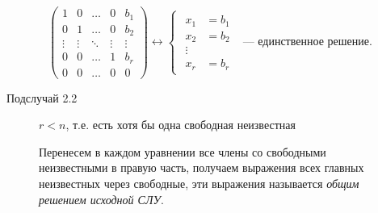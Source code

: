 \begin{description}
\begin{description}
        \begin{equation*}
            \begin{pmatrix}
                1 & 0 & \dots & 0 & b_1 \\
                0 & 1 & \dots & 0 & b_2 \\
                \vdots & \vdots & \ddots & \vdots & \vdots \\
                0 & 0 & \dots & 1 & b_r \\
                0 & 0 & \dots & 0 & 0
            \end{pmatrix} \leftrightarrow \begin{cases}
                \begin{aligned}
                    x_1 &= b_1 \\
                    x_2 &= b_2 \\
                    \vdots \\
                    x_r &= b_r
                \end{aligned}
            \end{cases} \text{ --- единственное решение}
        .\end{equation*}
    \item[Подслучай 2.2] $r < n$, т.е. есть хотя бы одна свободная неизвестная

        Перенесем в каждом уравнении все члены со свободными неизвестными в правую часть, получаем выражения всех главных неизвестных через свободные, эти выражения называется \textit{общим решением исходной СЛУ}.
    \end{description}
\end{description}

